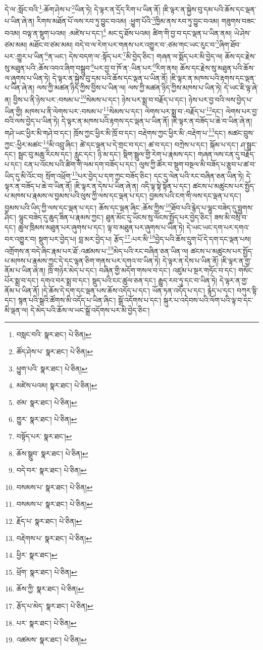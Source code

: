 དེ་ལ་:སློང་བའི་\footnote{བསླང་བའི་  སྣར་ཐང་།  པེ་ཅིན། }:ཆོག་ཤེས་པ་\footnote{ཚོད་ཤེས་པ་  སྣར་ཐང་།  པེ་ཅིན། }ཡིན་ཏེ། དེ་ལྟར་ན་དྲོད་རིག་པ་ཡིན་ནོ། །ཇི་ལྟར་ན་སྐྱེས་བུ་དམ་པའི་ཆོས་དང་ལྡན་པ་ཡིན་ཞེ་ན། རིགས་མཐོན་པོ་ལས་རབ་ཏུ་བྱུང་བའམ། :ཕྱུག་པོའི་\footnote{ཕྱུག་པའི་  སྣར་ཐང་།  པེ་ཅིན། }ཁྱིམ་ནས་རབ་ཏུ་བྱུང་བའམ། གཟུགས་བཟང་བའམ། བལྟ་ན་སྡུག་པའམ། :མཛེས་པ་དང་།\footnote{མཛེས་པའམ།  སྣར་ཐང་།  པེ་ཅིན། } མང་དུ་ཐོས་པའམ། ཚིག་གི་བྱ་བ་དང་ལྡན་པ་ཡིན་ནམ། ཡེ་ཤེས་ཙམ་མམ། མཐོང་བ་ཙམ་མམ། བདེ་བ་ལ་རེག་པར་གནས་པར་འགྱུར་བ་:ཙམ་གང་ཡང་རུང་བ་\footnote{ཙམ་  སྣར་ཐང་།  པེ་ཅིན། }ཞིག་ཐོབ་པར་:གྱུར་པ་ཡིན་\footnote{གྱུར་  སྣར་ཐང་།  པེ་ཅིན། }ན་ཡང་། དེས་བདག་ལ་:སྟོད་པར་\footnote{བསྟོད་པར་  སྣར་ཐང་། }མི་བྱེད་ཅིང་། གཞན་ལ་སྨོད་པར་མི་བྱེད་ལ། ཆོས་དང་རྗེས་སུ་མཐུན་པའི་:ཆོས་འབའ་ཞིག་བསྒྲུབ་\footnote{ཆོས་སྒྲུབ་  སྣར་ཐང་།  པེ་ཅིན། }པར་བྱ་བ་ཁོ་ན་:ཡིན་པར་\footnote{བདེ་བར་  སྣར་ཐང་།  པེ་ཅིན། }རིག་ནས། ཆོས་དང་རྗེས་སུ་མཐུན་པའི་ཆོས་ལ་ཞུགས་པ་ཡིན་ཏེ། དེ་ལྟར་ན་སྐྱེས་བུ་དམ་པའི་ཆོས་དང་ལྡན་པ་ཡིན་ནོ། །ཇི་ལྟར་ན་མཁས་པའི་རྟགས་དང་ལྡན་པ་ཡིན་ཞེ་ན། ལས་ཀྱི་མཚན་ཉིད་ཀྱིས་བྱིས་པ་ཡིན་ལ། ལས་ཀྱི་མཚན་ཉིད་ཀྱིས་མཁས་པ་ཡིན་ཏེ། དེ་ཡང་ཇི་ལྟ་ཞེ་ན། བྱིས་པ་ནི་ཉེས་པར་:བསམ་པ་\footnote{བསམས་པ་  སྣར་ཐང་།  པེ་ཅིན། }སེམས་པ་དང་། ཉེས་པར་སྨྲ་བ་བརྗོད་པ་དང་། ཉེས་པར་བྱ་བའི་ལས་བྱེད་པ་ཡིན་གྱི། མཁས་པ་ནི་ལེགས་པར་:བསམ་པ་\footnote{བསམས་པ་  སྣར་ཐང་།  པེ་ཅིན། }སེམས་པ་དང་། ལེགས་པར་སྨྲ་བ་:བརྗོད་པ་\footnote{རྗོད་པ་  སྣར་ཐང་།  པེ་ཅིན། }དང་། ལེགས་པར་བྱ་བའི་ལས་བྱེད་པ་ཡིན་ཏེ། དེ་ལྟར་ན་མཁས་པའི་རྟགས་དང་ལྡན་པ་ཡིན་ནོ། །ཇི་ལྟར་ན་བཟོད་པ་ཆེ་བ་ཡིན་ཞེ་ན། གཤེ་ཡང་ཕྱིར་མི་གཤེ་བ་དང་། ཁྲོས་ཀྱང་ཕྱིར་མི་ཁྲོ་བ་དང་། བརྡེགས་ཀྱང་ཕྱིར་མི་:བརྡེག་པ་\footnote{བརྡེགས་པ་  སྣར་ཐང་།  པེ་ཅིན། }དང་། མཚང་བྲུས་ཀྱང་:ཕྱིར་མཚང་\footnote{ཕྱིར་  སྣར་ཐང་། }མི་འབྲུ་ཞིང་། ཚེ་དང་ལྡན་པ་དེ་གྲང་བ་དང་། ཚ་བ་དང་། བཀྲེས་པ་དང་། སྐོམ་པ་དང་། ཤ་སྦྲང་དང་། སྦྲང་བུ་མཆུ་རིངས་དང་། རླུང་དང་། ཉི་མ་དང་། སྡིག་སྦྲུལ་གྱི་རེག་པ་རྣམས་དང་། གཞན་ལས་ངན་དུ་བརྗོད་པ་དང་། ངན་པ་འོངས་པའི་ཚིག་གི་ལམ་དག་བཟོད་པ་དང་། ལུས་ཀྱི་ཚོར་བ་སྡུག་བསྔལ་མི་བཟོད་པ་རྩུབ་པ་ཚ་བ་ཡིད་དུ་མི་འོང་བ། སྲོག་འཕྲོག་\footnote{ཕྲོག་  སྣར་ཐང་།  པེ་ཅིན། }པར་བྱེད་པ་དག་ཀྱང་བཟོད་ཅིང་། དང་དུ་ལེན་པའི་རང་བཞིན་ཅན་ཡིན་ཏེ། དེ་ལྟར་ན་བཟོད་པ་ཆེ་བ་ཡིན་ནོ། །ཇི་ལྟར་ན་དེས་པ་ཡིན་ཞེ་ན། འདི་ལྟ་སྟེ་སྟོན་པ་དང་། ཚངས་པ་མཚུངས་པར་སྤྱོད་པ་མཁས་པ་རྣམས་ལ་བྱམས་པའི་ལུས་ཀྱི་ལས་དང་ལྡན་པ་དང་། བྱམས་པའི་ངག་གི་ལས་དང་ལྡན་པ་དང་། བྱམས་པའི་ཡིད་ཀྱི་ལས་དང་ལྡན་པ་དང་། ཆོས་དང་ལྡན་ཞིང་:ཆོས་ཀྱིས་\footnote{ཆོས་ཀྱི་  སྣར་ཐང་།  པེ་ཅིན། }ཐོབ་པའི་རྙེད་པ་ལྷུང་བཟེད་དུ་བླུགས་ཤིང་། ལྷུང་བཟེད་དུ་ཆུད་ཟིན་པ་རྣམས་ཀྱང་། ཐུན་མོང་དུ་ཡོངས་སུ་ལོངས་སྤྱོད་པར་བྱེད་ཅིང་། ཟས་མི་བསྲི་བ་དང་། ཚུལ་ཁྲིམས་མཐུན་པར་ཞུགས་པ་དང་། ལྟ་བ་མཐུན་པར་ཞུགས་པ་ཡིན་ཏེ། དེ་ཡང་ཡང་དག་པར་དགའ་བར་འགྱུར་བ། སྡུག་པར་བྱེད་པ། བླ་མར་བྱེད་པ། རྩོད་\footnote{རྩོད་པ་མེད་  སྣར་ཐང་།  པེ་ཅིན། }:པར་མི་\footnote{པར་  སྣར་ཐང་།  པེ་ཅིན། }བྱེད་པའི་ཆོས་དྲུག་པོ་དེ་དག་དང་ལྡན་པས། འགྲོགས་ན་བདེ་ཞིང་རྣམ་པར་ཐོ་:འཚམས་པ་\footnote{འཚམས་  སྣར་ཐང་།  པེ་ཅིན། }མེད་པའི་རང་བཞིན་ཅན་ཡིན་ལ། ཚངས་པ་མཚུངས་པར་སྤྱོད་པ་མཁས་པ་རྣམས་ཀྱང་དེ་དང་ལྷན་ཅིག་གནས་པར་དགའ་བ་ཡིན་ཏེ། དེ་ལྟར་ན་དེས་པ་ཡིན་ནོ། །ཇི་ལྟར་ན་གྱ་ནོམ་པ་ཡིན་ཞེ་ན། ཁྲོ་གཉེར་མེད་པ་དང་། བཞིན་གྱི་མདོག་གསལ་བ་དང་། འཛུམ་པ་སྔར་གཏོང་བ་དང་། གསོང་པོར་སྨྲ་བ་དང་། དགའ་བར་སྨྲ་བ་དང་། སྡུད་པའི་ངང་ཚུལ་ཅན་དང་། རྒྱུད་རབ་ཏུ་དང་བ་ཡིན་ཏེ། དེ་ལྟར་ན་གྱ་ནོམ་པ་ཡིན་ནོ། །དེ་ཆོས་དེ་དག་དང་ལྡན་པས་ཆོས་འདོད་པ་དང་། ཡོན་ཏན་འདོད་པ་དང་། རྙེད་པ་དང་། བཀུར་སྟི་དང་། སྙན་པའི་སྒྲའི་ཚོགས་མི་འདོད་པ་ཡིན་ཞིང་། སྒྲོ་འདོགས་པ་དང་། སྐུར་པ་འདེབས་པའི་ལོག་པའི་ལྟ་བ་དང་མི་ལྡན་ལ། དེ་མེད་པའི་ཆོས་ལ་ཡང་སྒྲོ་འདོགས་པར་མི་བྱེད་ཅིང་། 